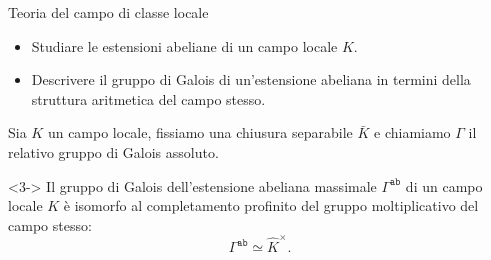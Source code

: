 \documentclass{beamer}
\newcommand{\Gal}[1]{\mathcal{G}al\left( #1 \right)}
\begin{document}
\begin{frame}{Teoria del campo di classe {locale}}

\begin{itemize}
	\item<1-> Studiare le estensioni abeliane di un campo {locale $K$}.
	\item<1-> Descrivere il gruppo di Galois di un'estensione abeliana in termini della struttura aritmetica del campo stesso.
\end{itemize}

Sia $ K $ un campo locale, fissiamo una chiusura separabile $ \bar{K} $ e chiamiamo $ \Gamma $ il relativo gruppo di Galois assoluto.


{\begin{theorem}<3->
		Il gruppo di Galois dell'estensione abeliana massimale $\Gamma^\mathtt{ab}$ di un campo locale $K$ è isomorfo al completamento profinito del gruppo moltiplicativo del campo stesso:
		\[  \Gamma^\mathtt{ab} \simeq \hat{K}^\times. \]
\end{theorem}}
\end{frame}

\end{document}
